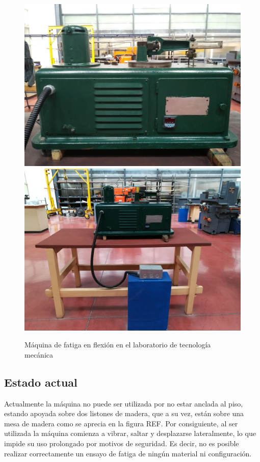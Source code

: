 \begin{figure}
\centering
\includegraphics[scale=0.05]{Imagenes/maq_del.jpg}
\label{fig:maq_del}
\includegraphics[scale=0.05]{Imagenes/maqfull_post.jpg}
\label{fig:maqfull_post}
\caption{Máquina de fatiga en flexión en el laboratorio de tecnología mecánica}
\label{fig:maq_fat}
\end{figure}


\subsection{Estado actual}
Actualmente la máquina no puede ser utilizada por no estar anclada al piso, estando apoyada sobre dos listones de madera, que a su vez, están sobre una mesa de madera como se aprecia en la figura REF. Por consiguiente, al ser utilizada la máquina comienza a vibrar, saltar y desplazarse lateralmente, lo que impide su uso prolongado por motivos de seguridad. Es decir, no es posible realizar correctamente un ensayo de fatiga de ningún material ni configuración.

